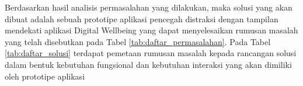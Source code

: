 

Berdasarkan hasil analisis permasalahan yang dilakukan, maka solusi yang akan dibuat adalah sebuah prototipe aplikasi pencegah distraksi dengan tampilan mendekati aplikasi Digital Wellbeing yang dapat menyelesaikan rumusan masalah yang telah disebutkan pada Tabel \ref{tab:daftar_permasalahan}. Pada Tabel \ref{tab:daftar_solusi} terdapat pemetaan rumusan masalah kepada rancangan solusi dalam bentuk kebutuhan fungsional dan kebutuhan interaksi yang akan dimiliki oleh prototipe aplikasi

